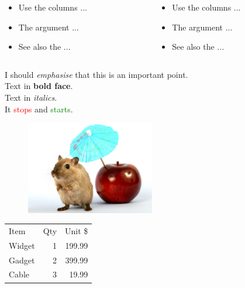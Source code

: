 \documentclass{beamer}
\begin{document}
\begin{frame}
\begin{columns}
\begin{column}{0.4\textwidth}
\begin{itemize}
\item Use the columns ...
\item The argument ...
\item See also the ...
\end{itemize}
\end{column}
\begin{column}{0.6\textwidth}
\begin{itemize}
\item Use the columns ...
\item The argument ...
\item See also the ...
\end{itemize}
\end{column}
\end{columns}
\end{frame}


\begin{frame}
I should \emph{emphasise} that this is an \alert{important} point.\\
Text in \textbf{bold face}.\\
Text in \textit{italics}.\\
It \textcolor{red}{stops} and \textcolor{green}{starts}.\\
\end{frame}


\begin{frame}
\begin{figure}
\includegraphics[width=0.5\textwidth]{gerbil}
\end{figure}
\end{frame}


\begin{frame}
\begin{center}
\begin{tabular}{lrr}
Item & Qty & Unit \$ \\
Widget & 1 & 199.99 \\
Gadget & 2 & 399.99 \\
Cable & 3 & 19.99 \\
\end{tabular}
\end{center}
\end{frame}
\end{document}
